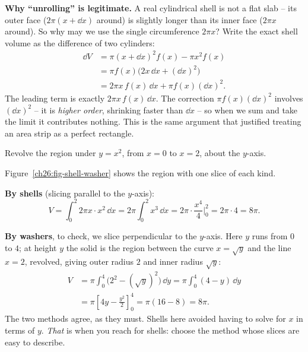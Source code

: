 \begin{whybox}
\textbf{Why ``unrolling'' is legitimate.} A real cylindrical shell is not a flat
slab -- its outer face ($2\pi(x+\dd x)$ around) is slightly longer than its inner
face ($2\pi x$ around). So why may we use the single circumference $2\pi x$? Write
the exact shell volume as the difference of two cylinders:
\begin{align*}
  \dd V &= \pi(x+\dd x)^2 f(x) - \pi x^2 f(x)\\
        &= \pi f(x)\bigl(2x\,\dd x + (\dd x)^2\bigr)\\
        &= 2\pi x\,f(x)\,\dd x + \pi f(x)(\dd x)^2.
\end{align*}
The leading term is exactly $2\pi x\,f(x)\,\dd x$. The correction
$\pi f(x)(\dd x)^2$ involves $(\dd x)^2$ -- it is \emph{higher order}, shrinking
faster than $\dd x$ -- so when we sum and take the limit it contributes nothing.
This is the same argument that justified treating an area strip as a
perfect rectangle.
\end{whybox}

\begin{example}
\label{ch26:ex-shell-check}
Revolve the region under $y = x^2$, from $x=0$ to $x=2$, about the $y$-axis.

Figure~\ref{ch26:fig-shell-washer} shows the region with one slice of each kind.

\textbf{By shells} (slicing parallel to the $y$-axis):
\[
  V = \int_0^2 2\pi x\cdot x^2\,\dd x = 2\pi\int_0^2 x^3\,\dd x
    = 2\pi\cdot\frac{x^4}{4}\Big|_0^2 = 2\pi\cdot 4 = 8\pi.
\]

\textbf{By washers}, to check, we slice perpendicular to the $y$-axis. Here $y$
runs from $0$ to $4$; at height $y$ the solid is the region between the curve
$x=\sqrt{y}$ and the line $x=2$, revolved, giving outer radius $2$ and inner
radius $\sqrt{y}$:
\begin{align*}
  V &= \pi\int_0^4\bigl(2^2 - (\sqrt y)^2\bigr)\,\dd y
     = \pi\int_0^4 (4 - y)\,\dd y\\
    &= \pi\left[4y - \frac{y^2}{2}\right]_0^4
     = \pi(16-8) = 8\pi.
\end{align*}
The two methods agree, as they must. Shells here avoided having to
solve for $x$ in terms of $y$. \emph{That} is when you reach for shells: choose
the method whose slices are easy to describe.
\end{example}

